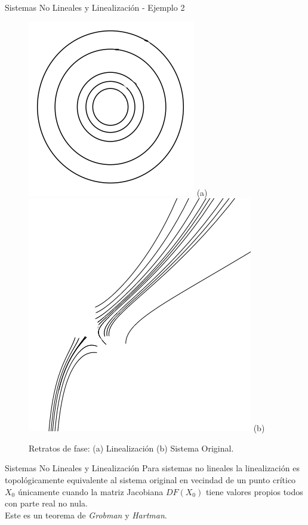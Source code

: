 \documentclass{beamer}
\begin{document}
\begin{frame}{Sistemas No Lineales y Linealización - Ejemplo 2}
\begin{figure}
	\includegraphics[scale=0.4]{figures/nonlinear2-linealization.png} (a)
	\includegraphics[scale=0.4]{figures/nonlinear2.png} (b)
	\caption{Retratos de fase: (a) Linealización (b) Sistema Original.}
\end{figure}
\end{frame}

\begin{frame}{Sistemas No Lineales y Linealización}
Para sistemas no lineales la linealización es topológicamente equivalente al sistema original en vecindad de un punto crítico $X_0$ únicamente cuando la matriz Jacobiana $DF(X_0)$ tiene valores propios todos con parte real no nula.\\
Este es un teorema de \emph{Grobman} y \emph{Hartman}.
\end{frame}
\end{document}
